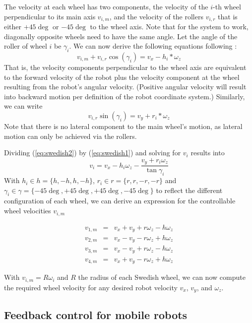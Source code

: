 The velocity at each wheel has two components, the velocity of the $i$-th wheel perpendicular to its main axis $v_{i,m}$, and the velocity of the rollers $v_{i,r}$ that is either $+45\deg$ or $-45\deg$ to the wheel axis. Note that for the system to work, diagonally opposite wheels need to have the same angle. Let the angle of the roller of wheel $i$ be $\gamma_i$. We can now derive the following equations following \cite{maulana2015inverse}:
\begin{equation}\label{eq:swedish1}
v_{i,m}+v_{i,r}\cos(\gamma_i) = v_x - h_i*\omega_z
\end{equation}
That is, the velocity components perpendicular to the wheel axis are equivalent to the forward velocity of the robot plus the velocity component at the wheel resulting from the robot's angular velocity. (Positive angular velocity will result into backward motion per definition of the robot coordinate system.) Similarly, we can write
\begin{equation}\label{eq:swedish2}
v_{i,r}\sin(\gamma_i) = v_y+r_i*\omega_z
\end{equation}
Note that there is no lateral component to the main wheel's motion, as lateral motion can only be achieved via the rollers.

Dividing (\ref{eq:swedish2}) by (\ref{eq:swedish1}) and solving for $v_i$ results into
\begin{equation}
v_i=v_x-h_i\omega_z-\frac{v_y+r_i\omega_z}{\tan{\gamma_i}}
\end{equation}
With $h_i \in h =\{h,-h,h,-h\}$, $r_i \in r=\{r,r,-r,-r\}$ and
$\gamma_i \in \gamma=\{-45\deg,+45\deg,+45\deg,-45\deg\}$ to reflect the different configuration of each wheel, we can derive an expression for the controllable wheel velocities $v_{i,m}$

\begin{eqnarray}
v_{1,m} &=& v_x+v_y+r\omega_z-h\omega_z \\
v_{2,m} &=& v_x-v_y-r\omega_z+h\omega_z \nonumber\\
v_{3,m} &=& v_x-v_y+r\omega_z-h\omega_z \nonumber\\
v_{4,m} &=& v_x+v_y-r\omega_z+h\omega_z \nonumber
\end{eqnarray}

With $v_{i,m}=R\omega_i$ and $R$ the radius of each Swedish wheel, we can now compute the required wheel velocity for any desired robot velocity $v_x$, $v_y$, and $\omega_z$.

\subsection{Feedback control for mobile robots}\label{sec:fbmobile}
\label{sec:kinematics:inverse:feedbackcontrol}

